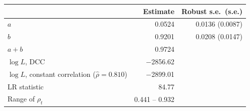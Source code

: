 \begin{tabular}{lrr}
\toprule
 & Estimate & Robust s.e.\ (s.e.) \\
\midrule
$a$ & 0.0524 & 0.0136 (0.0087) \\
$b$ & 0.9201 & 0.0208 (0.0147) \\
$a+b$ & 0.9724 & \\
\midrule
$\log L$, DCC & $-$2856.62 & \\
$\log L$, constant correlation ($\hat\rho = 0.810$) & $-$2899.01 & \\
LR statistic & 84.77 & \\
Range of $\rho_t$ & 0.441 -- 0.932 & \\
\bottomrule
\end{tabular}